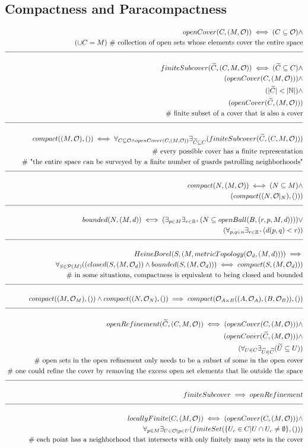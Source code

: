 \documentclass[a4paper]{article}
\newcommand{\eqComment}[1]{\text{  \# #1}}
\newcommand{\n}{\\[1.5ex] \hline \nonumber \\[0ex]}
\newcommand{\m}{\nonumber \\}
\begin{document}
\subsection{Compactness and Paracompactness}
\begin{tcolorbox}
\begin{align}
   openCover(C, (M, \mathcal{O})) \iff (C \subseteq \mathcal{O}) \land
\m (\cup C = M) \eqComment{collection of open sets whose elements cover the entire space}
\n finiteSubcover(\widetilde{C}, (C, M, \mathcal{O})) \iff (\widetilde{C} \subseteq C) \land
\m (openCover(C, (M, \mathcal{O}))) \land
\m (|\widetilde{C}| < |\mathbb{N}|) \land
\m (openCover(\widetilde{C}, (M, \mathcal{O})))
\m \eqComment{finite subset of a cover that is also a cover}
\n compact((M, \mathcal{O}), ()) \iff \forall_{C \subseteq \mathcal{O} \land openCover(C, (M, \mathcal{O}))} \exists_{\widetilde{C} \subseteq C} (finiteSubcover(\widetilde{C}, (C, M, \mathcal{O})))
\m \eqComment{every possible cover has a finite representation}
\m \eqComment{"the entire space can be surveyed by a finite number of guards patrolling neighborhoods"}
\n compact(N, (M, \mathcal{O})) \iff (N \subseteq M ) \land
\m (compact((N, \mathcal{O}|_N), ()))
\n bounded(N, (M, d)) \iff (\exists_{p \in M} \exists_{r \in \mathbb{R}^+} (N \subseteq openBall(B, (r, p, M, d)))) \lor
\m (\forall_{p, q \in n} \exists_{r \in \mathbb{R}^+}(d(p, q) < r))
\n HeineBorel(S, (M, metricTopology(\mathcal{O}_d, (M, d)))) \implies 
\m \forall_{S \in \mathcal{P}(M)} ((closed(S, (M, \mathcal{O}_d)) \land bounded(S, (M, \mathcal{O}_d))) \iff compact(S, (M, \mathcal{O}_d)))
\m \eqComment{in some situations, compactness is equivalent to being closed and bounded}
\n compact((M, \mathcal{O}_M), ()) \land compact((N, \mathcal{O}_N), ()) \implies compact(\mathcal{O}_{A \times B}((A, \mathcal{O}_A), (B, \mathcal{O}_B)), ())
\n openRefinement(\widetilde{C}, (C, M, \mathcal{O})) \iff (openCover(C, (M, \mathcal{O}))) \land
\m (openCover(\widetilde{C}, (M, \mathcal{O}))) \land
\m (\forall_{U \in C} \exists_{\widetilde{U} \in \widetilde{C}} (\widetilde{U} \subseteq U))
\m \eqComment{open sets in the open refinement only needs to be a subset of some in the open cover}
\m \eqComment{one could refine the cover by removing the excess open set elements that lie outside the space}
\n finiteSubcover \implies openRefinement
\n locallyFinite(C, (M, \mathcal{O})) \iff (openCover(C, (M, \mathcal{O}))) \land 
\m \forall_{p \in M} \exists_{U \in \mathcal{O}| p \in U} (finiteSet(\{U_c \in C| U \cap U_c \neq \emptyset\}, ()))
\m \eqComment{each point has a neighborhood that intersects with only finitely many sets in the cover}

\end{align}
\end{tcolorbox}
\end{document}
